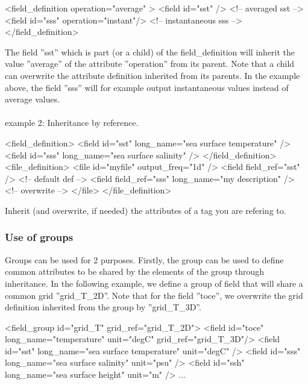 \documentclass[../main/NEMO_manual]{subfiles}
\begin{document}
\begin{xmllines}
<field_definition operation="average" >
	<field id="sst"                    />   <!-- averaged      sst -->
	<field id="sss" operation="instant"/>   <!-- instantaneous sss -->
</field_definition>
\end{xmllines}

The field ''sst'' which is part (or a child) of the field\_definition will inherit the value ''average'' of
the attribute ''operation'' from its parent.
Note that a child can overwrite the attribute definition inherited from its parents.
In the example above, the field ''sss'' will for example output instantaneous values instead of average values.
\\
\\
example 2: Inheritance by reference.

\begin{xmllines}
<field_definition>
	<field id="sst" long_name="sea surface temperature" />
	<field id="sss" long_name="sea surface salinity"    />
</field_definition>
<file_definition>
	<file id="myfile" output_freq="1d" />
		<field field_ref="sst"                            />  <!-- default def -->
		<field field_ref="sss" long_name="my description" />  <!-- overwrite   -->
	</file>
</file_definition>
\end{xmllines}

Inherit (and overwrite, if needed) the attributes of a tag you are refering to.

\subsubsection{Use of groups}

Groups can be used for 2 purposes.
Firstly, the group can be used to define common attributes to be shared by the elements of
the group through inheritance.
In the following example, we define a group of field that will share a common grid ''grid\_T\_2D''.
Note that for the field ''toce'', we overwrite the grid definition inherited from the group by ''grid\_T\_3D''.

\begin{xmllines}
<field_group id="grid_T" grid_ref="grid_T_2D">
	<field id="toce" long_name="temperature"             unit="degC" grid_ref="grid_T_3D"/>
	<field id="sst"  long_name="sea surface temperature" unit="degC"                     />
	<field id="sss"  long_name="sea surface salinity"    unit="psu"                      />
	<field id="ssh"  long_name="sea surface height"      unit="m"                        />
	...
\end{xmllines}
\end{document}
